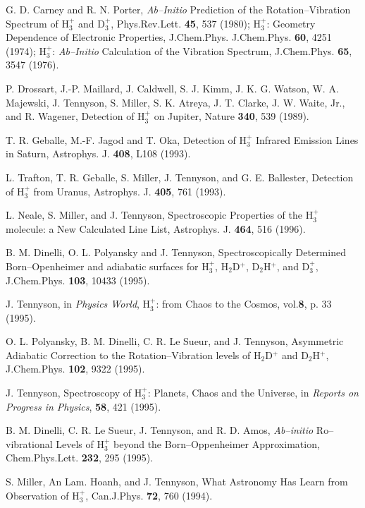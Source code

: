 \begin{thebibliography}{999}
G. D. Carney and R. N. Porter, 
{\it Ab--Initio} Prediction of the Rotation--Vibration 
Spectrum of H$_3^+$ and D$_3^+$,
Phys.Rev.Lett. {\bf 45}, 537 (1980);
H$_3^+$: Geometry Dependence of Electronic Properties, J.Chem.Phys. 
J.Chem.Phys. {\bf 60}, 4251 (1974);
H$_3^+$: {\it Ab--Initio} Calculation of the Vibration Spectrum,
J.Chem.Phys. {\bf 65}, 3547 (1976).

P. Drossart, J.-P. Maillard, J. Caldwell, S. J. Kimm,
J. K. G. Watson, W. A. Majewski, J. Tennyson, S. Miller, S. K. Atreya,
J. T. Clarke, J. W. Waite, Jr., and R. Wagener, 
Detection of H$_3^+$ on Jupiter,
Nature {\bf 340},
539 (1989).

T. R. Geballe, M.-F. Jagod and T. Oka, 
Detection of H$_3^+$ Infrared Emission Lines
in Saturn,
Astrophys. J. {\bf 408},
L108 (1993).

L. Trafton, T. R. Geballe, S. Miller, J. Tennyson, and
G. E. Ballester, 
Detection of H$_3^+$ from Uranus,
Astrophys. J. {\bf 405}, 761 (1993).

L. Neale, S. Miller, and J. Tennyson, 
Spectroscopic Properties of the H$_3^+$ molecule:
a New Calculated Line List,
Astrophys. J. {\bf 464}, 516
(1996).

B. M. Dinelli, O. L. Polyansky and J. Tennyson, 
Spectroscopically Determined Born--Openheimer and
adiabatic surfaces for 
H$_3^+$, H$_2$D$^+$, D$_2$H$^+$, and D$_3^+$,
J.Chem.Phys. {\bf 103},
10433 (1995).

J. Tennyson, in {\em Physics World}, 
H$_3^+$: from Chaos to the Cosmos,
vol.{\bf 8}, p. 33 (1995).

O. L. Polyansky, B. M. Dinelli, C. R. Le Sueur, and J. Tennyson,
Asymmetric Adiabatic Correction to the Rotation--Vibration levels
of H$_2$D$^+$ and D$_2$H$^+$,
J.Chem.Phys. {\bf 102}, 9322 (1995).

J. Tennyson, 
Spectroscopy of H$_3^+$: Planets, Chaos and the Universe,
in {\em Reports on Progress in Physics}, {\bf 58},
421 (1995).

B. M. Dinelli, C. R. Le Sueur, J. Tennyson, and R. D. Amos,
{\it Ab--initio} Ro--vibrational Levels of H$_3^+$ beyond the
Born--Oppenheimer Approximation,
Chem.Phys.Lett. {\bf 232}, 295 (1995).

S. Miller, An Lam. Hoanh, and J. Tennyson,
What Astronomy Has Learn from Observation of H$_3^+$,
Can.J.Phys. {\bf 72}, 760 (1994).


\end{thebibliography}
